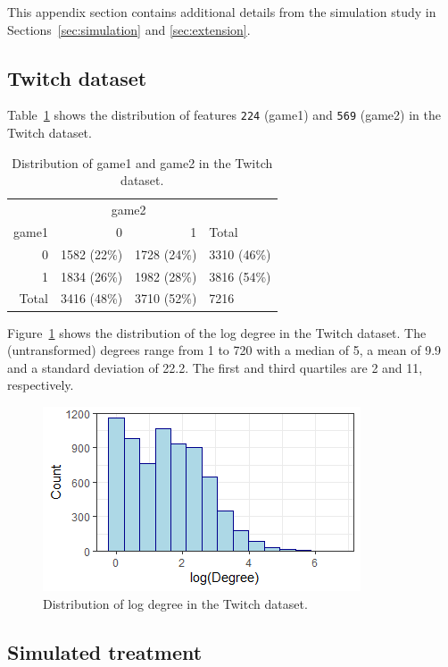 \documentclass[10pt]{article}
\begin{document}
This appendix section contains additional details from the simulation study in Sections~\ref{sec:simulation} and \ref{sec:extension}.

\subsection{Twitch dataset} \label{apx:twitch}

Table~\ref{tab:features} shows the distribution of features \verb|224| (game1) and \verb|569| (game2) in the Twitch dataset.
\\

\begin{table}[H]
\centering
\begin{tabular}{@{}rrrl@{}}
\toprule
& \multicolumn{2}{c}{game2} \\
\cmidrule(lr){2-3}
game1 & 0 & 1 & Total \\
\midrule
0 & 1582 (22\%) & 1728 (24\%) & 3310 (46\%) \\
1 & 1834 (26\%) & 1982 (28\%) & 3816 (54\%) \\
Total & 3416 (48\%) & 3710 (52\%) & 7216 \\
\bottomrule
\end{tabular}
\caption{Distribution of game1 and game2 in the Twitch dataset.}
\label{tab:features}
\end{table}

Figure~\ref{fig:degree} shows the distribution of the log degree in the Twitch dataset. The (untransformed) degrees range from 1 to 720 with a median of 5, a mean of 9.9 and a standard deviation of 22.2. The first and third quartiles are 2 and 11, respectively.

\begin{figure}[H]
\centering
\includegraphics{Images/degree_dist.png}
\caption{Distribution of log degree in the Twitch dataset.}
\label{fig:degree}
\end{figure}

\subsection{Simulated treatment} \label{apx:covbal}
\end{document}
